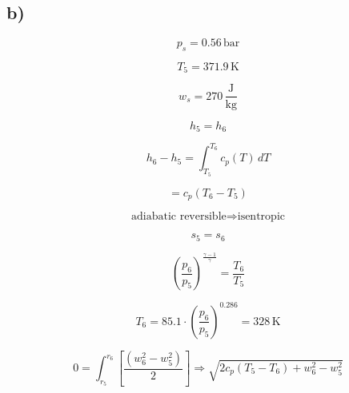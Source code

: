 

\subsection*{b)}

\[
p_s = 0.56 \, \text{bar}
\]

\[
T_5 = 371.9 \, \text{K}
\]

\[
w_s = 270 \, \frac{\text{J}}{\text{kg}}
\]

\[
h_5 = h_6
\]

\[
h_6 - h_5 = \int_{T_5}^{T_6} c_p(T) \, dT
\]

\[
= c_p (T_6 - T_5)
\]

\[
\text{adiabatic reversible} \Rightarrow \text{isentropic}
\]

\[
s_5 = s_6
\]

\[
\left( \frac{p_6}{p_5} \right)^{\frac{\gamma - 1}{\gamma}} = \frac{T_6}{T_5}
\]

\[
T_6 = 85.1 \cdot \left( \frac{p_6}{p_5} \right)^{0.286} = 328 \, \text{K}
\]

\[
0 = \int_{r_5}^{r_6} \left[ \frac{(w_6^2 - w_5^2)}{2} \right] \Rightarrow \sqrt{2 c_p (T_5 - T_6) + w_6^2 - w_5^2}
\]